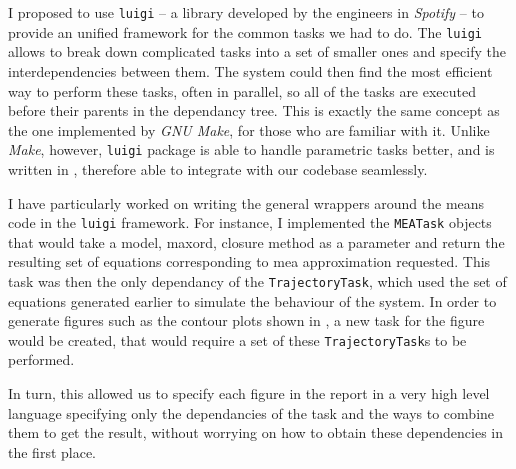 I proposed to use \verb"luigi"\cite{_luigi_????} -- a \python{} library developed by the engineers in \emph{Spotify} -- to provide an unified framework for the common tasks we had to do. 
The \verb"luigi" allows to break down complicated tasks into a set of smaller ones and specify the interdependencies between them.
The system could then find the most efficient way to perform these  tasks, often in parallel, so all of the tasks are executed before their parents in the dependancy tree. 
This is exactly the same concept as the one implemented by \emph{GNU Make}\cite{gnumake}, for those who are familiar with it. Unlike \emph{Make}, however, \verb"luigi" package is able to handle parametric tasks better, and is written in \py{}, therefore able to integrate with our codebase seamlessly.

I have particularly worked on writing the general wrappers around the means code in the \verb"luigi" framework. 
For instance, I implemented the \verb"MEATask" objects that would take a model, \gls{maxord}, closure method as a parameter and return the resulting set of equations corresponding to \gls{mea} approximation requested. 
This task was then the only dependancy of the \verb"TrajectoryTask", which used the set of equations generated earlier to simulate the behaviour of the system. 
In order to generate figures such as the contour plots shown in , a new task for the figure would be created, that would require a set of these \verb"TrajectoryTask"s to be performed. 

In turn, this allowed us to specify each figure in the report in a very high level language specifying only the dependancies of the task and the ways to combine them to get the result, without worrying on how to obtain these dependencies in the first place.

